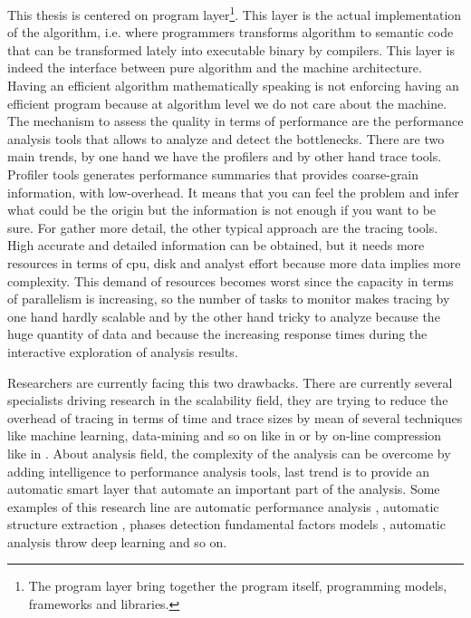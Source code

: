 This thesis is centered on program layer\footnote{The program layer 
bring together the program itself, programming models, frameworks and libraries.}. 
This layer is the actual implementation of the algorithm, i.e. where programmers
transforms algorithm to  semantic code that can be transformed lately into
executable binary by compilers. This layer is indeed the interface between pure 
algorithm and the machine architecture. Having an efficient algorithm
mathematically speaking is not enforcing having an efficient program 
because at algorithm level we do not care about the machine. 
The mechanism to assess the quality in terms of performance are the performance 
analysis tools that allows to analyze and detect the bottlenecks. 
There are two main trends, by one hand we have the profilers and by other hand trace
tools. Profiler tools generates performance summaries that provides 
coarse-grain information, with low-overhead. It means that you can feel the problem 
and infer what could be the origin but the information is not enough if you want 
to be sure. For gather more detail, the other typical approach are the tracing 
tools. High accurate and detailed information can be obtained, but it needs 
more resources in terms of cpu, disk and analyst effort because more data implies 
more complexity. This demand of resources becomes worst since the capacity in 
terms of parallelism is increasing, so the number of tasks to monitor makes 
tracing by one hand hardly scalable and by the other hand tricky to analyze
because the huge quantity of data and because the increasing response times
during the interactive exploration of analysis results. 

Researchers are currently facing this two drawbacks. There are currently several
specialists driving research in the scalability field, they are trying to reduce 
the overhead of tracing in terms of time and trace sizes by mean of several 
techniques like machine learning, data-mining and so on like in 
\cite{llort2015intelligent} or by on-line compression like in
\cite{noeth2009scalatrace}. About analysis field, the complexity of the analysis 
can be overcome by adding intelligence to performance analysis tools, last 
trend is to provide an automatic smart layer that automate an important part 
of the analysis. Some examples of this 
research line are automatic performance analysis \cite{wolf2003automatic}, 
automatic structure extraction \cite{casas2007automatic}, phases detection 
\cite{gonzalez2013application} fundamental factors models \cite{casas2008aass}, 
automatic analysis throw deep learning \cite{simon:2017:perfdp} and so on.


